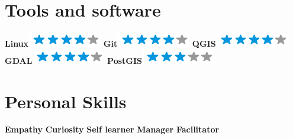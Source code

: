 \documentclass[]{friggeri-cv}
\begin{document}
\begin{aside}
  \section{Tools and software}
    \textbf{Linux}\includegraphics[scale=0.40]{img/4stars.png}
    \textbf{Git}\includegraphics[scale=0.40]{img/4stars.png}
    \textbf{QGIS}\includegraphics[scale=0.40]{img/4stars.png}
    \textbf{GDAL}\includegraphics[scale=0.40]{img/4stars.png}
    \textbf{PostGIS}\includegraphics[scale=0.40]{img/3stars.png}
    ~
  \section{Personal Skills}
    \textbf{Empathy}
    \textbf{Curiosity}
    \textbf{Self learner}
    \textbf{Manager}
    \textbf{Facilitator} 
    ~
\end{aside}

\end{document}
